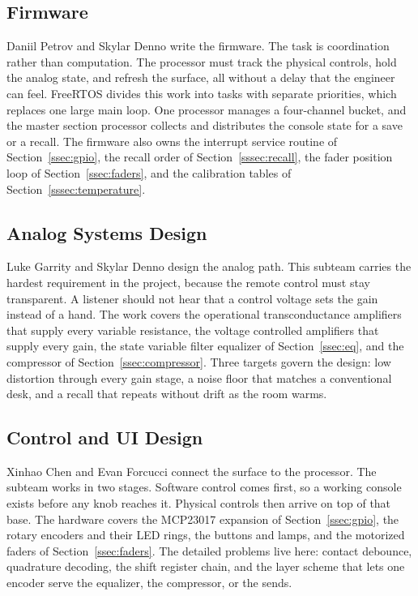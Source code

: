 \documentclass[11pt, letterpaper,titlepage]{article}
\begin{document}
\subsection{Firmware}
\label{ssec:task-firmware}

Daniil Petrov and Skylar Denno write the firmware. The task is coordination
rather than computation. The processor must track the physical controls, hold
the analog state, and refresh the surface, all without a delay that the engineer
can feel. FreeRTOS divides this work into tasks with separate priorities, which
replaces one large main loop. One processor manages a four-channel bucket, and
the master section processor collects and distributes the console state for a
save or a recall. The firmware also owns the interrupt service routine of
Section~\ref{ssec:gpio}, the recall order of Section~\ref{sssec:recall}, the
fader position loop of Section~\ref{ssec:faders}, and the calibration tables of
Section~\ref{sssec:temperature}.

\subsection{Analog Systems Design}
\label{ssec:task-analog}

Luke Garrity and Skylar Denno design the analog path. This subteam carries the
hardest requirement in the project, because the remote control must stay
transparent. A listener should not hear that a control voltage sets the gain
instead of a hand. The work covers the operational transconductance amplifiers
that supply every variable resistance, the voltage controlled amplifiers that
supply every gain, the state variable filter equalizer of
Section~\ref{ssec:eq}, and the compressor of Section~\ref{ssec:compressor}.
Three targets govern the design: low distortion through every gain stage, a
noise floor that matches a conventional desk, and a recall that repeats without
drift as the room warms.

\subsection{Control and UI Design}
\label{ssec:task-control}

Xinhao Chen and Evan Forcucci connect the surface to the processor. The subteam
works in two stages. Software control comes first, so a working console exists
before any knob reaches it. Physical controls then arrive on top of that base.
The hardware covers the MCP23017 expansion of Section~\ref{ssec:gpio}, the
rotary encoders and their LED rings, the buttons and lamps, and the motorized
faders of Section~\ref{ssec:faders}. The detailed problems live here: contact
debounce, quadrature decoding, the shift register chain, and the layer scheme
that lets one encoder serve the equalizer, the compressor, or the sends.
\end{document}
